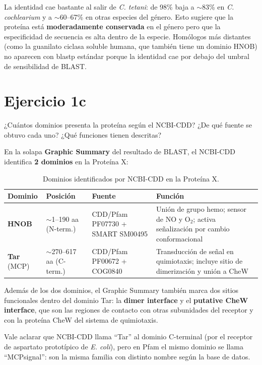 La identidad cae bastante al salir de \textit{C. tetani}: de 98\% baja a $\sim$83\% en
\textit{C. cochlearium} y a $\sim$60--67\% en otras especies del género. Esto sugiere que la
proteína está \textbf{moderadamente conservada} en el género pero que la especificidad de
secuencia es alta dentro de la especie. Homólogos más distantes (como la guanilato ciclasa
soluble humana, que también tiene un dominio HNOB) no aparecen con blastp estándar porque la
identidad cae por debajo del umbral de sensibilidad de BLAST.

\section{Ejercicio 1c}

\begin{consigna}
¿Cuántos dominios presenta la proteína según el NCBI-CDD? ¿De qué fuente se obtuvo cada uno?
¿Qué funciones tienen descritas?
\end{consigna}

En la solapa \textbf{Graphic Summary} del resultado de BLAST, el NCBI-CDD identifica
\textbf{2 dominios} en la Proteína X:

\begin{table}[H]
\centering
\footnotesize
\begin{tabular}{lllP{5.5cm}}
\toprule
Dominio & Posición & Fuente & Función \\
\midrule
\textbf{HNOB} & $\sim$1--190 aa (N-term.) & CDD/Pfam PF07730 + SMART SM00495 & Unión de grupo hemo; sensor de NO y O$_2$; activa señalización por cambio conformacional \\[4pt]
\textbf{Tar} (MCP) & $\sim$270--617 aa (C-term.) & CDD/Pfam PF00672 + COG0840 & Transducción de señal en quimiotaxis; incluye sitio de dimerización y unión a CheW \\
\bottomrule
\end{tabular}
\caption{Dominios identificados por NCBI-CDD en la Proteína X.}
\end{table}

Además de los dos dominios, el Graphic Summary también marca dos sitios funcionales dentro del
dominio Tar: la \textbf{dimer interface} y el \textbf{putative CheW interface}, que son las
regiones de contacto con otras subunidades del receptor y con la proteína CheW del sistema de
quimiotaxis.

Vale aclarar que NCBI-CDD llama ``Tar'' al dominio C-terminal (por el receptor de aspartato
prototípico de \textit{E. coli}), pero en Pfam el mismo dominio se llama ``MCPsignal'': son
la misma familia con distinto nombre según la base de datos.
